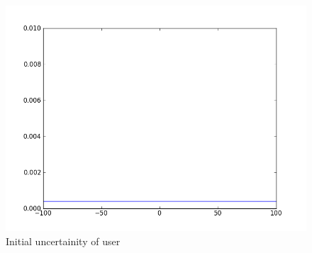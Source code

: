 \documentclass[12pt]{article}			%
\begin{document}
\begin{figure}
	\caption{Initial uncertainity of user}
	\centering
\includegraphics[scale=0.6]{img/mu_sig1.png}
\end{figure}
\end{document}
